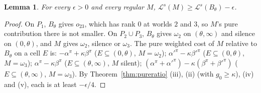 \documentclass[11pt]{article}
\newtheorem{lemma}[theorem]{Lemma}
\theoremstyle{definition}\newtheorem{definition}[theorem]{Definition}
\theoremstyle{remark}\newtheorem{remark}[theorem]{Remark}
\begin{document}
\begin{lemma}\label{lem:weightedpure}
For every $\epsilon>0$ and every regular $M$,
$\mathcal L^s(M)\ge \mathcal L^s(B_\theta)-\epsilon$.
\end{lemma}
\begin{proof}
On $P_1$, $B_\theta$ gives $o_{23}$, which has rank $0$ at worlds $2$ and
$3$, so $M$'s pure contribution there is not smaller. On $P_2\cup P_3$,
$B_\theta$ gives $\omega_2$ on $(\theta,\infty)$ and silence on
$(0,\theta)$, and $M$ gives $\omega_2$, silence or $\omega_3$. The pure
weighted cost of $M$ relative to $B_\theta$ on a cell $E$ is:
$-\alpha^\pi+\kappa\beta^\pi$ ($E\subseteq(0,\theta)$, $M=\omega_2$);
$\alpha'^\pi-\kappa\beta'^\pi$ ($E\subseteq(0,\theta)$, $M=\omega_3$);
$\alpha^\pi-\kappa\beta^\pi$ ($E\subseteq(\theta,\infty)$, $M$ silent);
$(\alpha^\pi+\alpha'^\pi)-\kappa(\beta^\pi+\beta'^\pi)$ ($E\subseteq(\theta,
\infty)$, $M=\omega_3$). By Theorem~\ref{thm:pureratio} (iii), (ii) (with
$g_0\ge\kappa$), (iv) and (v), each is at least $-\epsilon/4$.
\end{proof}
\end{document}
